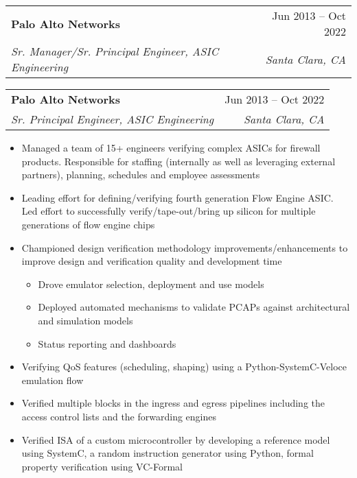 \documentclass[letterpaper,12pt]{article}[leftmargin=*]
\makeatletter
\def \entryspacing {-0pt}
\newcommand{\resumeEntryStart}{\begin{itemize}[leftmargin=2.5mm]}
\newcommand{\resumeEntryEnd}{\end{itemize}\vspace{\entryspacing}}
\newcommand{\resumeItemListStart}{\begin{itemize}[leftmargin=4.5mm]}
\newcommand{\resumeItemListEnd}{\end{itemize}}
\newcommand{\resumeItem}[1]{
\item\small{
  {#1 \vspace{-2pt}}
}
}
\newcommand{\resumeEntryTSDL}[4]{
  \vspace{-1pt}\item[]
  \begin{tabularx}{0.97\textwidth}{X@{\hspace{60pt}}r}
    \textbf{\color{primary}#1} & {\firabook\color{accent}\small#2} \\
    \textit{\color{accent}\small#3} & \textit{\color{accent}\small#4} \\
  \end{tabularx}\vspace{-6pt}
}
\newcommand{\resumeEntryTSDLpart}[2]{
  \vspace{-6pt}\item[]
  \begin{tabularx}{0.97\textwidth}{X@{\hspace{60pt}}r}
    \textit{\color{accent}\small#1} & \textit{\color{accent}\small#2} \\
  \end{tabularx}\vspace{-6pt}
}
\makeatother
\begin{document}
\resumeEntryStart
{} {
\resumeEntryTSDL
    {Palo Alto Networks}{Jun 2013 -- Oct 2022}
    {Sr. Manager/Sr. Principal Engineer, ASIC Engineering}{Santa Clara, CA}
}{
\resumeEntryTSDL
    {Palo Alto Networks}{Jun 2013 -- Oct 2022}
    {Sr. Principal Engineer, ASIC Engineering}{Santa Clara, CA}
}
    \resumeItemListStart
    \resumeItem {Managed a team of 15+ engineers verifying complex ASICs for firewall products. Responsible for staffing (internally as well as leveraging external partners), planning, schedules and employee assessments}
    \resumeItem {Leading effort for defining/verifying fourth generation Flow Engine ASIC. Led effort to successfully verify/tape-out/bring up silicon for multiple generations of flow engine chips}
    \resumeItem {Championed design verification methodology improvements/enhancements to improve design and verification quality and development time}
        \resumeItemListStart    
        \resumeItem {Drove emulator selection, deployment and use models}        
        \resumeItem {Deployed automated mechanisms to validate PCAPs against architectural and simulation models}
        \resumeItem {Status reporting and dashboards}
        \resumeItemListEnd    
     \resumeItem {Verifying QoS features (scheduling, shaping) using a Python-SystemC-Veloce emulation flow}
     \resumeItem {Verified multiple blocks in the ingress and egress pipelines including the access control lists and the forwarding engines}
     \resumeItem {Verified ISA of a custom microcontroller by developing a reference model using SystemC, a random instruction generator using Python, formal property verification using VC-Formal}
    \resumeItemListEnd
\resumeEntryEnd
\end{document}
